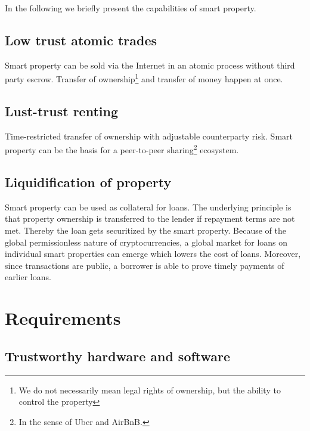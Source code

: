 In the following we briefly present the capabilities of smart property.

\subsection{Low trust atomic trades}

Smart property can be sold via the Internet in an atomic process without third party escrow. Transfer of ownership\footnote{We do not necessarily mean legal rights of ownership, but the ability to control the property} and transfer of money happen at once. 



\subsection{Lust-trust renting}

Time-restricted transfer of ownership with adjustable counterparty risk. Smart property can be the basis for a peer-to-peer sharing\footnote{In the sense of Uber and AirBnB.} ecosystem. 

\subsection{Liquidification of property}

Smart property can be used as collateral for loans. The underlying principle is that property ownership is transferred to the lender if repayment terms are not met. Thereby the loan gets securitized by the smart property. Because of the global permissionless nature of cryptocurrencies, a global market for loans on individual smart properties can emerge which lowers the cost of loans. Moreover, since transactions are public, a borrower is able to prove timely payments of earlier loans. 

\section{Requirements}

\subsection{Trustworthy hardware and software}

